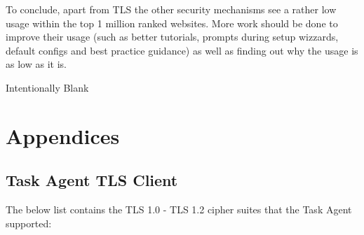 \documentclass{mscreport}
\begin{document}
\vspace{0.3cm} \noindent
To conclude, apart from TLS the other security mechanisms see a rather low usage within the top 1 million ranked websites. More work should be done to improve their usage (such as better tutorials, prompts during setup wizzards, default configs and best practice guidance) as well as finding out why the usage is as low as it is.

\newpage



\vspace*{\fill}
\begin{center}
\begin{huge}
Intentionally Blank
\end{huge}
\end{center}
\vspace{\fill}

\newpage






\newpage
\chapter*{Appendices}
\appendix
\renewcommand\thesection{\Alph{section}}
\section{Task Agent TLS Client}
\label{apdx:task_agent_tls_client}
\noindent
The below list contains the TLS 1.0 - TLS 1.2 cipher suites that the Task Agent supported:
\end{document}
